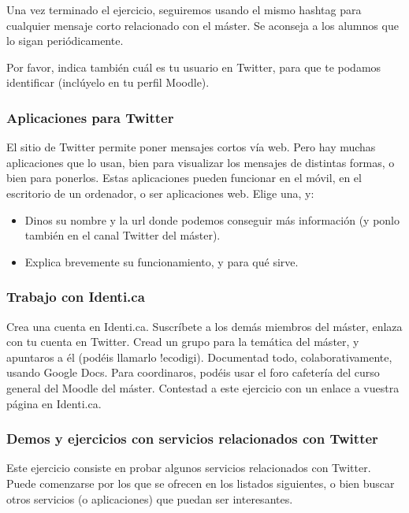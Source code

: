 \documentclass[a4paper,12pt]{article}
\begin{document}
Una vez terminado el ejercicio, seguiremos usando el mismo hashtag para cualquier mensaje corto relacionado con el máster. Se aconseja a los alumnos que lo sigan periódicamente.

Por favor, indica también cuál es tu usuario en Twitter, para que te podamos identificar (inclúyelo en tu perfil Moodle).

\subsubsection{Aplicaciones para Twitter}
\label{sub:apptwitter}

El sitio de Twitter permite poner mensajes cortos vía web. Pero hay muchas aplicaciones que lo usan, bien para visualizar los mensajes de distintas formas, o bien para ponerlos. Estas aplicaciones pueden funcionar en el móvil, en el escritorio de un ordenador, o ser aplicaciones web. Elige una, y:

\begin{itemize}
\item Dinos su nombre y la url donde podemos conseguir más información (y ponlo también en el canal Twitter del máster).
\item Explica brevemente su funcionamiento, y para qué sirve.
\end{itemize}

\subsubsection{Trabajo con Identi.ca}
\label{sub:identica}

Crea una cuenta en Identi.ca. Suscríbete a los demás miembros del máster, enlaza con tu cuenta en Twitter. Cread un grupo para la temática del máster, y apuntaros a él (podéis llamarlo !ecodigi). Documentad todo, colaborativamente, usando Google Docs. Para coordinaros, podéis usar el foro cafetería del curso general del Moodle del máster. Contestad a este ejercicio con un enlace a vuestra página en Identi.ca.

\subsubsection{Demos y ejercicios con servicios relacionados con Twitter}
\label{sub:twitter-relacion}

Este ejercicio consiste en probar algunos servicios relacionados con Twitter. Puede comenzarse por los que se ofrecen en los listados siguientes, o bien buscar otros servicios (o aplicaciones) que puedan ser interesantes.
\end{document}
